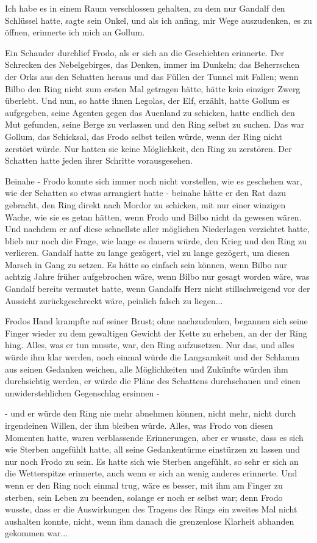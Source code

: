 \glqq{}Ich habe es in einem Raum verschlossen gehalten, zu dem nur Gandalf den
Schlüssel hatte\grqq{}, sagte sein Onkel, \glqq{}und als ich anfing, mir Wege
auszudenken, es zu öffnen, erinnerte ich mich an Gollum.\grqq{}

Ein Schauder durchlief Frodo, als er sich an die Geschichten erinnerte. Der
Schrecken des Nebelgebirges, das Denken, immer im Dunkeln; das Beherrschen der
Orks aus den Schatten heraus und das Füllen der Tunnel mit Fallen; wenn Bilbo
den Ring nicht zum ersten Mal getragen hätte, hätte kein einziger Zwerg
überlebt. Und nun, so hatte ihnen Legolas, der Elf, erzählt, hatte Gollum es
aufgegeben, seine Agenten gegen das Auenland zu schicken, hatte endlich den Mut
gefunden, seine Berge zu verlassen und den Ring selbst zu suchen. Das war
Gollum, das Schicksal, das Frodo selbst teilen würde, wenn der Ring nicht
zerstört würde. Nur hatten sie keine Möglichkeit, den Ring zu zerstören. Der
Schatten hatte jeden ihrer Schritte vorausgesehen.

Beinahe - Frodo konnte sich immer noch nicht vorstellen, wie es geschehen war,
wie der Schatten so etwas arrangiert hatte - beinahe hätte er den Rat dazu
gebracht, den Ring direkt nach Mordor zu schicken, mit nur einer winzigen Wache,
wie sie es getan hätten, wenn Frodo und Bilbo nicht da gewesen wären. Und
nachdem er auf diese schnellste aller möglichen Niederlagen verzichtet hatte,
blieb nur noch die Frage, wie lange es dauern würde, den Krieg und den Ring zu
verlieren. Gandalf hatte zu lange gezögert, viel zu lange gezögert, um diesen
Marsch in Gang zu setzen. Es hätte so einfach sein können, wenn Bilbo nur
achtzig Jahre früher aufgebrochen wäre, wenn Bilbo nur gesagt worden wäre, was
Gandalf bereits vermutet hatte, wenn Gandalfs Herz nicht stillschweigend vor der
Aussicht zurückgeschreckt wäre, peinlich falsch zu liegen...

Frodos Hand krampfte auf seiner Brust; ohne nachzudenken, begannen sich seine
Finger wieder zu dem gewaltigen Gewicht der Kette zu erheben, an der der Ring
hing. Alles, was er tun musste, war, den Ring aufzusetzen. Nur das, und alles
würde ihm klar werden, noch einmal würde die Langsamkeit und der Schlamm aus
seinen Gedanken weichen, alle Möglichkeiten und Zukünfte würden ihm durchsichtig
werden, er würde die Pläne des Schattens durchschauen und einen
unwiderstehlichen Gegenschlag ersinnen -

- und er würde den Ring nie mehr abnehmen können, nicht mehr, nicht durch
irgendeinen Willen, der ihm bleiben würde. Alles, was Frodo von diesen Momenten
hatte, waren verblassende Erinnerungen, aber er wusste, dass es sich wie Sterben
angefühlt hatte, all seine Gedankentürme einstürzen zu lassen und nur noch Frodo
zu sein. Es hatte sich wie Sterben angefühlt, so sehr er sich an die
Wetterspitze erinnerte, auch wenn er sich an wenig anderes erinnerte. Und wenn
er den Ring noch einmal trug, wäre es besser, mit ihm am Finger zu sterben, sein
Leben zu beenden, solange er noch er selbst war; denn Frodo wusste, dass er die
Auswirkungen des Tragens des Rings ein zweites Mal nicht aushalten konnte,
nicht, wenn ihm danach die grenzenlose Klarheit abhanden gekommen war...

